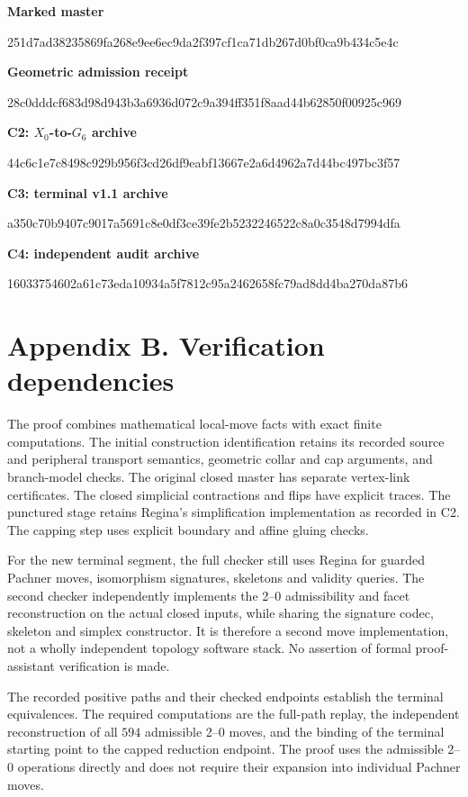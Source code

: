 \documentclass[11pt,letterpaper]{article}
\begin{document}
\smallskip\textbf{Marked master}\par
{\small\ttfamily 251d7ad38235869fa268e9ee6ec9da2f397cf1ca71db267d0bf0ca9b434c5e4c\par}
\smallskip\textbf{Geometric admission receipt}\par
{\small\ttfamily 28c0dddcf683d98d943b3a6936d072c9a394ff351f8aad44b62850f00925c969\par}
\smallskip\textbf{C2: $X_0$-to-$G_6$ archive}\par
{\small\ttfamily 44c6c1e7c8498c929b956f3cd26df9eabf13667e2a6d4962a7d44bc497bc3f57\par}
\smallskip\textbf{C3: terminal v1.1 archive}\par
{\small\ttfamily a350c70b9407c9017a5691c8e0df3ce39fe2b5232246522c8a0c3548d7994dfa\par}
\smallskip\textbf{C4: independent audit archive}\par
{\small\ttfamily 16033754602a61c73eda10934a5f7812c95a2462658fc79ad8dd4ba270da87b6\par}
\section*{Appendix B. Verification dependencies}
The proof combines mathematical local-move facts with exact finite computations. The initial construction identification retains its recorded source and peripheral transport semantics, geometric collar and cap arguments, and branch-model checks. The original closed master has separate vertex-link certificates. The closed simplicial contractions and flips have explicit traces. The punctured stage retains Regina's simplification implementation as recorded in C2. The capping step uses explicit boundary and affine gluing checks.

For the new terminal segment, the full checker still uses Regina for guarded Pachner moves, isomorphism signatures, skeletons and validity queries. The second checker independently implements the 2--0 admissibility and facet reconstruction on the actual closed inputs, while sharing the signature codec, skeleton and simplex constructor. It is therefore a second move implementation, not a wholly independent topology software stack. No assertion of formal proof-assistant verification is made.

The recorded positive paths and their checked endpoints establish the terminal equivalences. The required computations are the full-path replay, the independent reconstruction of all $594$ admissible 2--0 moves, and the binding of the terminal starting point to the capped reduction endpoint. The proof uses the admissible 2--0 operations directly and does not require their expansion into individual Pachner moves.
\end{document}
